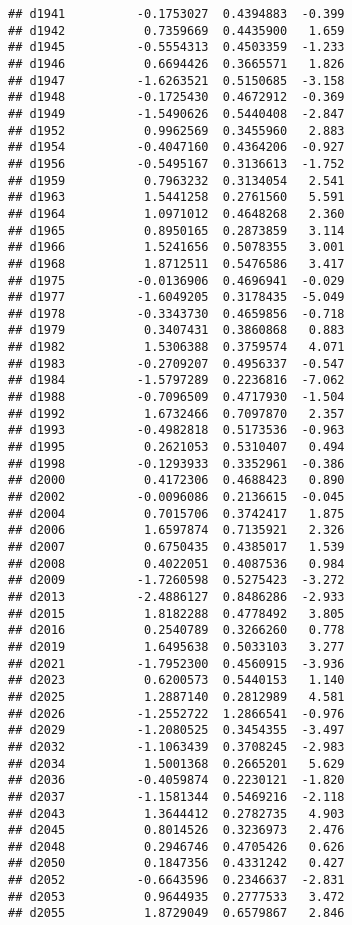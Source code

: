 \documentclass[
]{article}
\begin{document}
\begin{verbatim}
## d1941          -0.1753027  0.4394883  -0.399
## d1942           0.7359669  0.4435900   1.659
## d1945          -0.5554313  0.4503359  -1.233
## d1946           0.6694426  0.3665571   1.826
## d1947          -1.6263521  0.5150685  -3.158
## d1948          -0.1725430  0.4672912  -0.369
## d1949          -1.5490626  0.5440408  -2.847
## d1952           0.9962569  0.3455960   2.883
## d1954          -0.4047160  0.4364206  -0.927
## d1956          -0.5495167  0.3136613  -1.752
## d1959           0.7963232  0.3134054   2.541
## d1963           1.5441258  0.2761560   5.591
## d1964           1.0971012  0.4648268   2.360
## d1965           0.8950165  0.2873859   3.114
## d1966           1.5241656  0.5078355   3.001
## d1968           1.8712511  0.5476586   3.417
## d1975          -0.0136906  0.4696941  -0.029
## d1977          -1.6049205  0.3178435  -5.049
## d1978          -0.3343730  0.4659856  -0.718
## d1979           0.3407431  0.3860868   0.883
## d1982           1.5306388  0.3759574   4.071
## d1983          -0.2709207  0.4956337  -0.547
## d1984          -1.5797289  0.2236816  -7.062
## d1988          -0.7096509  0.4717930  -1.504
## d1992           1.6732466  0.7097870   2.357
## d1993          -0.4982818  0.5173536  -0.963
## d1995           0.2621053  0.5310407   0.494
## d1998          -0.1293933  0.3352961  -0.386
## d2000           0.4172306  0.4688423   0.890
## d2002          -0.0096086  0.2136615  -0.045
## d2004           0.7015706  0.3742417   1.875
## d2006           1.6597874  0.7135921   2.326
## d2007           0.6750435  0.4385017   1.539
## d2008           0.4022051  0.4087536   0.984
## d2009          -1.7260598  0.5275423  -3.272
## d2013          -2.4886127  0.8486286  -2.933
## d2015           1.8182288  0.4778492   3.805
## d2016           0.2540789  0.3266260   0.778
## d2019           1.6495638  0.5033103   3.277
## d2021          -1.7952300  0.4560915  -3.936
## d2023           0.6200573  0.5440153   1.140
## d2025           1.2887140  0.2812989   4.581
## d2026          -1.2552722  1.2866541  -0.976
## d2029          -1.2080525  0.3454355  -3.497
## d2032          -1.1063439  0.3708245  -2.983
## d2034           1.5001368  0.2665201   5.629
## d2036          -0.4059874  0.2230121  -1.820
## d2037          -1.1581344  0.5469216  -2.118
## d2043           1.3644412  0.2782735   4.903
## d2045           0.8014526  0.3236973   2.476
## d2048           0.2946746  0.4705426   0.626
## d2050           0.1847356  0.4331242   0.427
## d2052          -0.6643596  0.2346637  -2.831
## d2053           0.9644935  0.2777533   3.472
## d2055           1.8729049  0.6579867   2.846

\end{verbatim}
\end{document}

